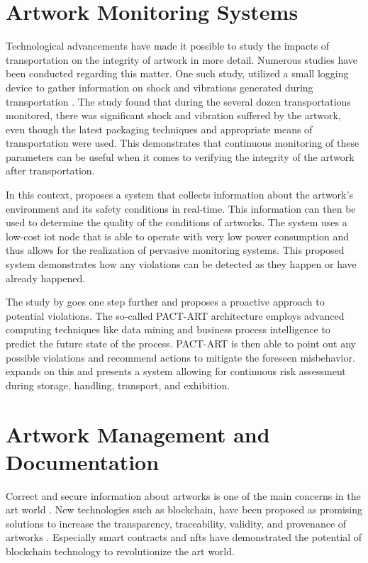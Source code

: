 \section{Artwork Monitoring Systems}
Technological advancements have made it possible to study the impacts of transportation on the integrity of artwork in more detail. Numerous studies have been conducted regarding this matter. One such study, utilized a small logging device to gather information on shock and vibrations generated during transportation \cite{shockvibrationtransit}. The study found that during the several dozen transportations monitored, there was significant shock and vibration suffered by the artwork, even though the latest packaging techniques and appropriate means of transportation were used. This demonstrates that continuous monitoring of these parameters can be useful when it comes to verifying the integrity of the artwork after transportation.

In this context, \cite{woodenartworkmonitoring} proposes a system that collects information about the artwork's environment and its safety conditions in real-time. This information can then be used to determine the quality of the conditions of artworks. The system uses a low-cost \gls{iot} node that is able to operate with very low power consumption and thus allows for the realization of pervasive monitoring systems. This proposed system demonstrates how any violations can be detected as they happen or have already happened. 

The study by \cite{pactart} goes one step further and proposes a proactive approach to potential violations. The so-called PACT-ART architecture employs advanced computing techniques like data mining and business process intelligence to predict the future state of the process. PACT-ART is then able to point out any possible violations and recommend actions to mitigate the foreseen misbehavior. \cite{riskmonitoring} expands on this and presents a system allowing for continuous risk assessment during storage, handling, transport, and exhibition.

\section{Artwork Management and Documentation}
Correct and secure information about artworks is one of the main concerns in the art world \cite{bcartmarket}. New technologies such as blockchain, have been proposed as promising solutions to increase the transparency, traceability, validity, and provenance of artworks \cite{cyberartmarket}. Especially smart contracts and \glspl{nft} have demonstrated the potential of blockchain technology to revolutionize the art world. 

